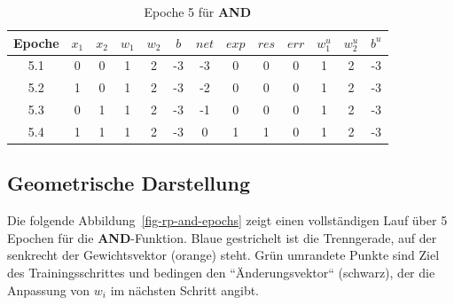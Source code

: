 \setlength{\tabcolsep}{0.8em}
\begin{table} %
    \centering
    \begin{tabular}{c | c | c | c | c | c | c | c | c | c | c | c | c}
        Epoche & $x_1$ & $x_2$ & $w_1$ & $w_2$ & $b$ & $net$ & $exp$ & $res$ & $err$ & $w^u_1$ & $w^u_2$ & $b^u$ \\
        \hline
        5.1& 0     & 0     & 1     & 2     & -3  & -3    & 0     & 0     & 0   & 1       & 2       & -3    \\
        5.2& 1     & 0     & 1     & 2     & -3  & -2    & 0     & 0     & 0   & 1       & 2       & -3    \\
        5.3& 0     & 1     & 1     & 2     & -3  & -1    & 0     & 0     & 0   & 1       & 2       & -3    \\
        5.4& 1     & 1     & 1     & 2     & -3  & 0     & 1     & 1     & 0   & 1       & 2       & -3    \\
    \end{tabular}
    \caption{Epoche 5 für \textbf{AND}}
    \label{tab:mcp-andep5}
\end{table}


\subsection*{Geometrische Darstellung}

Die folgende Abbildung~\ref{fig-rp-and-epochs} zeigt einen vollständigen Lauf über 5 Epochen für die \textbf{AND}-Funktion.
Blaue gestrichelt ist die Trenngerade, auf der senkrecht der Gewichtsvektor (orange) steht.
Grün umrandete Punkte sind Ziel des Trainingsschrittes und bedingen den ``Änderungsvektor`` (schwarz), der die Anpassung von $w_i$ im nächsten Schritt angibt.

